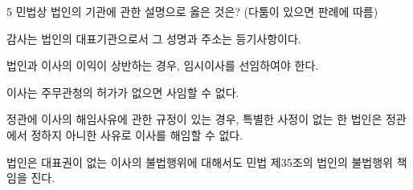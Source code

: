 \begin{question}{5}
민법상 법인의 기관에 관한 설명으로 옳은 것은? (다툼이 있으면 판례에 따름)
\begin{choices}
  \item 감사는 법인의 대표기관으로서 그 성명과 주소는 등기사항이다.
  \item 법인과 이사의 이익이 상반하는 경우, 임시이사를 선임하여야 한다.
  \item 이사는 주무관청의 허가가 없으면 사임할 수 없다.
  \item 정관에 이사의 해임사유에 관한 규정이 있는 경우, 특별한 사정이 없는 한 법인은 정관에서 정하지 아니한 사유로 이사를 해임할 수 없다.
  \item 법인은 대표권이 없는 이사의 불법행위에 대해서도 민법 제35조의 법인의 불법행위 책임을 진다.
\end{choices}
\end{question}
